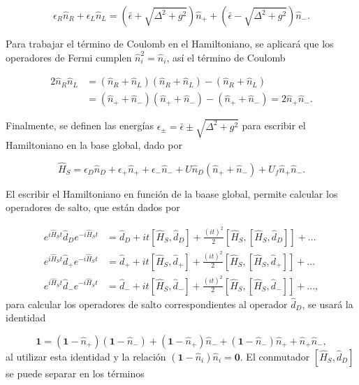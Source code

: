 \begin{appendixs}
\begin{equation*}
    \epsilon_{R} \hat{n}_{R} + \epsilon_{L} \hat{n}_{L} = (\bar{\epsilon} + \sqrt{\Delta^{2} + g^{2}})\hat{n}_{+} +  (\bar{\epsilon} - \sqrt{\Delta^{2} + g^{2}})\hat{n}_{-}.
\end{equation*}

Para trabajar el término de Coulomb en el Hamiltoniano, se aplicará que los operadores de Fermi cumplen $\hat{n}^{2}_{i} = \hat{n}_{i}$, así el término de Coulomb 

\begin{align*}
    2 \hat{n}_{R}\hat{n}_{L} & = (\hat{n}_{R} +\hat{n}_{L})(\hat{n}_{R} +\hat{n}_{L}) - (\hat{n}_{R} + \hat{n}_{L}) \\
    & = (\hat{n}_{+} +\hat{n}_{-})(\hat{n}_{+} +\hat{n}_{-}) - (\hat{n}_{+} + \hat{n}_{-})  = 2\hat{n}_{+}\hat{n}_{-}.
\end{align*}

Finalmente, se definen las energías $\epsilon_{\pm} = \bar{\epsilon} \pm \sqrt{\Delta^{2}+g^{2}}$ para escribir el Hamiltoniano en la base global, dado por 

\begin{equation}
    \hat{H}_{S} = \epsilon_{D}\hat{n}_{D} + \epsilon_{+}\hat{n}_{+} + \epsilon_{-}\hat{n}_{-} + U\hat{n}_{D}(\hat{n}_{+} + \hat{n}_{-}) + U_{f}\hat{n}_{+}\hat{n}_{-}.
    \label{apendix5:ec4}
\end{equation}

El escribir el Hamiltoniano en función de la baase global, permite calcular los operadores de salto, que están dados por 

\begin{align*}
    e^{i \hat{H}_{S}t}\hat{d}_{D}e^{-i\hat{H}_{S}t} & = \hat{d}_{D} + it[\hat{H}_{S},\hat{d}_{D}] + \frac{(it)^{2}}{2} [\hat{H}_{S},[\hat{H}_{S},\hat{d}_{D}]] +... \\
    e^{i \hat{H}_{S}t}\hat{d}_{+}e^{-i\hat{H}_{S}t} & = \hat{d}_{+} + it[\hat{H}_{S},\hat{d}_{+}] + \frac{(it)^{2}}{2} [\hat{H}_{S},[\hat{H}_{S},\hat{d}_{+}]] +... \\
    e^{i \hat{H}_{S}t}\hat{d}_{-}e^{-i\hat{H}_{S}t} & = \hat{d}_{-} + it[\hat{H}_{S},\hat{d}_{-}] + \frac{(it)^{2}}{2} [\hat{H}_{S},[\hat{H}_{S},\hat{d}_{-}]] +...,
\end{align*}
para calcular los operadores de salto correspondientes al operador $\hat{d}_{D}$, se usará la identidad

\begin{equation*}
    \textbf{1} = (\textbf{1} - \hat{n}_{+})(\textbf{1}-\hat{n}_{-}) + (\textbf{1} - \hat{n}_{+})\hat{n}_{-} + (\textbf{1} - \hat{n}_{-})\hat{n}_{+} + \hat{n}_{+}\hat{n}_{-},
\end{equation*}
al utilizar esta identidad y la relación $(\textbf{1} - \hat{n}_{i})\hat{n}_{i} = \textbf{0}$. El conmutador $[\hat{H}_{S},\hat{d}_{D}]$ se puede separar en los términos


\end{appendixs}
